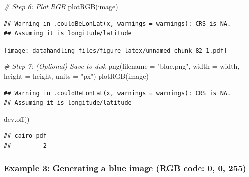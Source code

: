 \documentclass[
  12pt,
]{style/krantz}
\newenvironment{Shaded}{\begin{snugshade}}{\end{snugshade}}
\newcommand{\AttributeTok}[1]{\textcolor[rgb]{0.77,0.63,0.00}{#1}}
\newcommand{\CommentTok}[1]{\textcolor[rgb]{0.56,0.35,0.01}{\textit{#1}}}
\newcommand{\FunctionTok}[1]{\textcolor[rgb]{0.00,0.00,0.00}{#1}}
\newcommand{\NormalTok}[1]{#1}
\newcommand{\StringTok}[1]{\textcolor[rgb]{0.31,0.60,0.02}{#1}}
\begin{document}
\begin{Shaded}
\begin{Highlighting}[]
\CommentTok{\# Step 6: Plot RGB}
\FunctionTok{plotRGB}\NormalTok{(image)}
\end{Highlighting}
\end{Shaded}

\begin{verbatim}
## Warning in .couldBeLonLat(x, warnings = warnings): CRS is NA.
## Assuming it is longitude/latitude
\end{verbatim}

\texttt{[image: datahandling\_files/figure-latex/unnamed-chunk-82-1.pdf]}

\begin{Shaded}
\begin{Highlighting}[]
\CommentTok{\# Step 7: (Optional) Save to disk}
\FunctionTok{png}\NormalTok{(}\AttributeTok{filename =} \StringTok{"blue.png"}\NormalTok{, }\AttributeTok{width =}\NormalTok{ width, }\AttributeTok{height =}\NormalTok{ height, }\AttributeTok{units =} \StringTok{"px"}\NormalTok{)}
\FunctionTok{plotRGB}\NormalTok{(image)}
\end{Highlighting}
\end{Shaded}

\begin{verbatim}
## Warning in .couldBeLonLat(x, warnings = warnings): CRS is NA.
## Assuming it is longitude/latitude
\end{verbatim}

\begin{Shaded}
\begin{Highlighting}[]
\FunctionTok{dev.off}\NormalTok{()}
\end{Highlighting}
\end{Shaded}

\begin{verbatim}
## cairo_pdf 
##         2
\end{verbatim}

\hypertarget{example-3-generating-a-blue-image-rgb-code-0-0-255}{%
\subsubsection{Example 3: Generating a blue image (RGB code: 0, 0, 255)}\label{example-3-generating-a-blue-image-rgb-code-0-0-255}}
\end{document}
